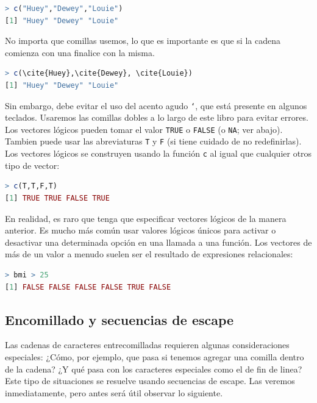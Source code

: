 \begin{lstlisting}[language=R]
> c("Huey","Dewey","Louie")
[1] "Huey" "Dewey" "Louie"
\end{lstlisting}

No importa que comillas usemos, lo que es importante es que si la cadena
comienza con una finalice con la misma.

\begin{lstlisting}[language=R]
> c(\cite{Huey},\cite{Dewey}, \cite{Louie})
[1] "Huey" "Dewey" "Louie"
\end{lstlisting}

Sin embargo, debe evitar el uso del acento agudo \texttt{`}, que está presente
en algunos teclados. Usaremos las comillas dobles a lo largo de este libro para
evitar errores. Los vectores lógicos pueden tomar el valor \texttt{TRUE} o
\texttt{FALSE} (o \texttt{NA}; ver abajo). Tambien puede usar las abreviaturas
\texttt{T} y \texttt{F} (si tiene cuidado de no redefinirlas). Los vectores
lógicos se construyen usando la función \texttt{c} al igual que cualquier otros
tipo de vector:

\begin{lstlisting}[language=R]
> c(T,T,F,T)
[1] TRUE TRUE FALSE TRUE
\end{lstlisting}

En realidad, es raro que tenga que especificar vectores lógicos de la manera
anterior. Es mucho más común usar valores lógicos únicos para activar o
desactivar una determinada opción en una llamada a una función. Los vectores de
más de un valor a menudo suelen ser el resultado de expresiones relacionales:


\begin{lstlisting}[language=R]
> bmi > 25
[1] FALSE FALSE FALSE FALSE TRUE FALSE
\end{lstlisting}

\subsection{Encomillado y secuencias de escape}\label{encomillado}

Las cadenas de caracteres entrecomilladas requieren algunas consideraciones
especiales: ¿Cómo, por ejemplo, que pasa si tenemos agregar una comilla dentro
de la cadena? ¿Y qué pasa con los caracteres especiales como el de fin de
linea? Este tipo de situaciones se resuelve usando secuencias de escape. Las
veremos inmediatamente, pero antes será útil observar lo siguiente.


